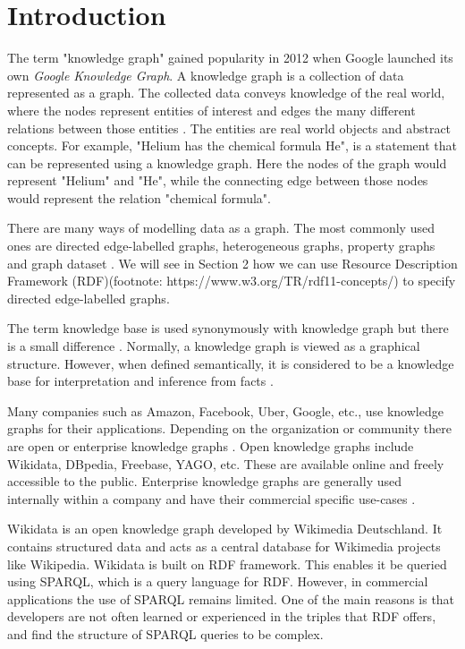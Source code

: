 \chapter{Introduction}

The term "knowledge graph" gained popularity in 2012 when Google launched its own \textit{Google Knowledge Graph}. A knowledge graph is a collection of data represented as a graph. The collected data conveys knowledge of the real world, where the nodes represent entities of interest and edges the many different relations between those entities \cite{Hogan2021}. The entities are real world objects and abstract concepts. For example, "Helium has the chemical formula He", is a statement that can be represented using a knowledge graph. Here the nodes of the graph would represent "Helium" and "He", while the connecting edge between those nodes would represent the relation "chemical formula". 

There are many ways of modelling data as a graph. The most commonly used ones are directed edge-labelled graphs, heterogeneous graphs, property graphs and graph dataset \cite{Hogan2021}. We will see in Section 2 how we can use Resource Description Framework (RDF)(footnote: https://www.w3.org/TR/rdf11-concepts/) to specify directed edge-labelled graphs.

The term knowledge base is used synonymously with knowledge graph but there is a small difference \cite{Ji2022}. Normally, a knowledge graph is viewed as a graphical structure. However, when defined semantically, it is considered to be a knowledge base for interpretation and inference from facts \cite{Bordes2011}. 

Many companies such as Amazon, Facebook, Uber, Google, etc., use knowledge graphs for their applications. Depending on the organization or community there are open or enterprise knowledge graphs \cite{Hogan2021}. Open knowledge graphs include Wikidata, DBpedia, Freebase, YAGO, etc. These are available online and freely accessible to the public. Enterprise knowledge graphs are generally used internally within a company and have their commercial specific use-cases \cite{Hogan2021}.

Wikidata is an open knowledge graph developed by Wikimedia Deutschland. It contains structured data and acts as a central database for Wikimedia projects like Wikipedia. Wikidata is built on RDF framework. This enables it be queried using SPARQL, which is a query language for RDF. However, in commercial applications the use of SPARQL remains limited. One of the main reasons is that developers are not often learned or experienced in the triples that RDF offers, and find the structure of SPARQL queries to be complex.  

